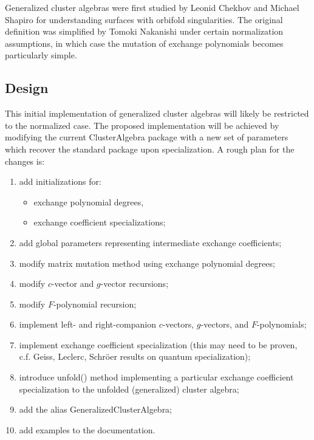 \documentclass{amsart}
\begin{document}
  Generalized cluster algebras were first studied by Leonid Chekhov and Michael Shapiro for understanding surfaces with orbifold singularities.
  The original definition was simplified by Tomoki Nakanishi under certain normalization assumptions, in which case the mutation of exchange polynomials becomes particularly simple.

  \subsection*{Design}
  This initial implementation of generalized cluster algebras will likely be restricted to the normalized case.
  The proposed implementation will be achieved by modifying the current ClusterAlgebra package with a new set of parameters which recover the standard package upon specialization.
  A rough plan for the changes is:
  \begin{enumerate}
    \item add initializations for:
      \begin{itemize}
        \item exchange polynomial degrees,
        \item exchange coefficient specializations;
      \end{itemize}
    \item add global parameters representing intermediate exchange coefficients;
    \item modify matrix mutation method using exchange polynomial degrees;
    \item modify $c$-vector and $g$-vector recursions;
    \item modify $F$-polynomial recursion;
    \item implement left- and right-companion $c$-vectors, $g$-vectors, and $F$-polynomials;
    \item implement exchange coefficient specialization (this may need to be proven, c.f. Geiss, Leclerc, Schr\"oer results on quantum specialization);
    \item introduce unfold() method implementing a particular exchange coefficient specialization to the unfolded (generalized) cluster algebra;
    \item add the alias GeneralizedClusterAlgebra;
    \item add examples to the documentation.
  \end{enumerate}
\end{document}
